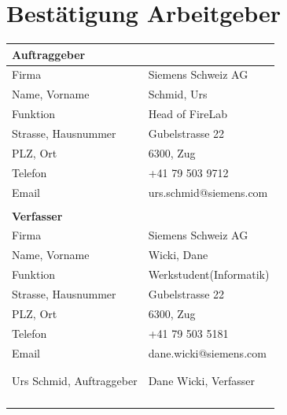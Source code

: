 \documentclass[10pt]{scrartcl}
\begin{document}
\section{Bestätigung Arbeitgeber}
\begin{center}
	\begin{tabular}{p{5.5cm} p{5.5cm}}
		\textbf{Auftraggeber} \\\hline
		Firma & Siemens Schweiz AG \\
		Name, Vorname & Schmid, Urs \\
		Funktion & Head of FireLab \\
		Strasse, Hausnummer & Gubelstrasse 22 \\
		PLZ, Ort & 6300, Zug \\
		Telefon & +41 79 503 9712 \\
		Email & urs.schmid@siemens.com \\
		&  \\
		\textbf{Verfasser} \\\hline
		Firma & Siemens Schweiz AG \\
		Name, Vorname & Wicki, Dane \\
		Funktion & Werkstudent(Informatik) \\
		Strasse, Hausnummer & Gubelstrasse 22 \\
		PLZ, Ort & 6300, Zug \\
		Telefon & +41 79 503 5181 \\
		Email & dane.wicki@siemens.com \\
		& \\
		& \\
		\multicolumn{1}{l|}{Urs Schmid, Auftraggeber}  & Dane Wicki, Verfasser  \\
		\multicolumn{1}{l|}{} &  \\
		\multicolumn{1}{l|}{} &  \\
		\multicolumn{1}{l|}{} &  \\\hhline{--}
	\end{tabular}
\end{center}
\printbibliography
\appendix
\printglossaries
\end{document}
